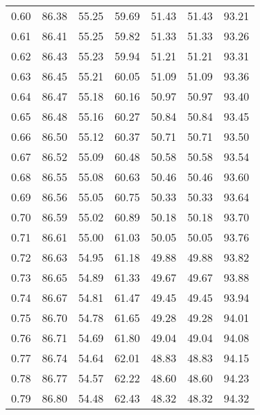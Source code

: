\begin{tabular}{|c|c|c|c|c|c|c|}
      0.60 &     86.38 &     55.25 &      59.69 &   51.43 &      51.43 &         93.21 \\
      0.61 &     86.41 &     55.25 &      59.82 &   51.33 &      51.33 &         93.26 \\
      0.62 &     86.43 &     55.23 &      59.94 &   51.21 &      51.21 &         93.31 \\
      0.63 &     86.45 &     55.21 &      60.05 &   51.09 &      51.09 &         93.36 \\
      0.64 &     86.47 &     55.18 &      60.16 &   50.97 &      50.97 &         93.40 \\
      0.65 &     86.48 &     55.16 &      60.27 &   50.84 &      50.84 &         93.45 \\
      0.66 &     86.50 &     55.12 &      60.37 &   50.71 &      50.71 &         93.50 \\
      0.67 &     86.52 &     55.09 &      60.48 &   50.58 &      50.58 &         93.54 \\
      0.68 &     86.55 &     55.08 &      60.63 &   50.46 &      50.46 &         93.60 \\
      0.69 &     86.56 &     55.05 &      60.75 &   50.33 &      50.33 &         93.64 \\
      0.70 &     86.59 &     55.02 &      60.89 &   50.18 &      50.18 &         93.70 \\
      0.71 &     86.61 &     55.00 &      61.03 &   50.05 &      50.05 &         93.76 \\
      0.72 &     86.63 &     54.95 &      61.18 &   49.88 &      49.88 &         93.82 \\
      0.73 &     86.65 &     54.89 &      61.33 &   49.67 &      49.67 &         93.88 \\
      0.74 &     86.67 &     54.81 &      61.47 &   49.45 &      49.45 &         93.94 \\
      0.75 &     86.70 &     54.78 &      61.65 &   49.28 &      49.28 &         94.01 \\
      0.76 &     86.71 &     54.69 &      61.80 &   49.04 &      49.04 &         94.08 \\
      0.77 &     86.74 &     54.64 &      62.01 &   48.83 &      48.83 &         94.15 \\
      0.78 &     86.77 &     54.57 &      62.22 &   48.60 &      48.60 &         94.23 \\
      0.79 &     86.80 &     54.48 &      62.43 &   48.32 &      48.32 &         94.32 \\

\end{tabular}
